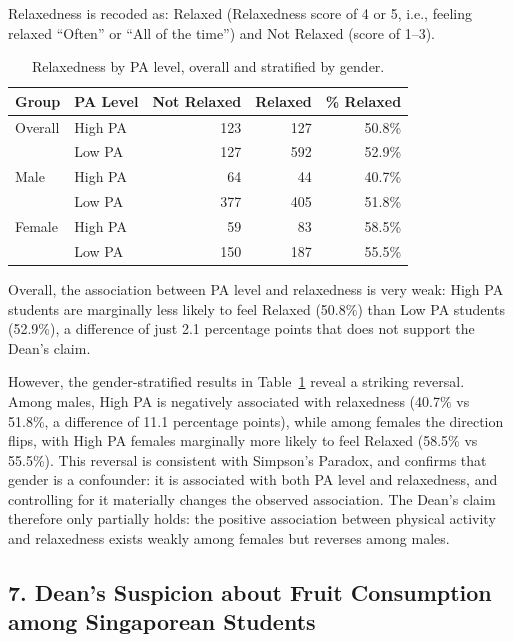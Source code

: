 Relaxedness is recoded as: Relaxed (Relaxedness score of 4 or 5, i.e., feeling relaxed ``Often'' or ``All of the time'') and Not Relaxed (score of 1--3).

\begin{table}[h!]
\centering
\begin{tabular}{@{}llrrr@{}}
\toprule
\textbf{Group} & \textbf{PA Level} & \textbf{Not Relaxed} & \textbf{Relaxed} & \textbf{\% Relaxed} \\
\midrule
Overall & High PA & 123 & 127 & 50.8\% \\
        & Low PA  & 127 & 592 & 52.9\% \\
\midrule
Male    & High PA & 64  & 44  & 40.7\% \\
        & Low PA  & 377 & 405 & 51.8\% \\
\midrule
Female  & High PA & 59  & 83  & 58.5\% \\
        & Low PA  & 150 & 187 & 55.5\% \\
\bottomrule
\end{tabular}
\caption{Relaxedness by PA level, overall and stratified by gender.}
\label{tab:relaxedness}
\end{table}

Overall, the association between PA level and relaxedness is very weak: High PA students are marginally less likely to feel Relaxed (50.8\%) than Low PA students (52.9\%), a difference of just 2.1 percentage points that does not support the Dean's claim.

However, the gender-stratified results in Table~\ref{tab:relaxedness} reveal a striking reversal. Among males, High PA is negatively associated with relaxedness (40.7\% vs 51.8\%, a difference of 11.1 percentage points), while among females the direction flips, with High PA females marginally more likely to feel Relaxed (58.5\% vs 55.5\%). This reversal is consistent with Simpson's Paradox, and confirms that gender is a confounder: it is associated with both PA level and relaxedness, and controlling for it materially changes the observed association. The Dean's claim therefore only partially holds: the positive association between physical activity and relaxedness exists weakly among females but reverses among males.

\subsection*{7. Dean's Suspicion about Fruit Consumption among Singaporean Students}

